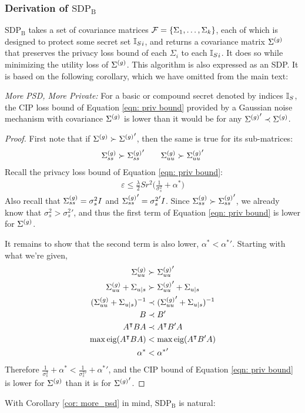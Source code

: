 \subsubsection{Derivation of $\text{SDP}_\text{B}$ }
\label{apx: SDP B}
$\text{SDP}_\text{B}$ takes a set of covariance matrices $\mathcal{F} = \{\Sigma_1, \dots, \Sigma_k\}$, each of which is designed to protect some secret set ${{\mathbb{I}_S}}_i$, and returns a covariance matrix $\Sigma^{(g)}$ that preserves the privacy loss bound of each $\Sigma_i$ to each ${{\mathbb{I}_S}}_i$. It does so while minimizing the utility loss of $\Sigma^{(g)}$. This algorithm is also expressed as an SDP. It is based on the following corollary, which we have omitted from the main text: 
\begin{corollary}\emph{More PSD, More Private: }
\label{cor: more_psd}
	For a basic or compound secret denoted by indices ${\mathbb{I}_S}$, the CIP loss bound of Equation \ref{eqn: priv bound} provided by a Gaussian noise mechanism with covariance $\Sigma^{(g)}$ is lower than it would be for any ${\Sigma^{(g)}}' \prec \Sigma^{(g)}$. 
\end{corollary}
\begin{proof}
	First note that if $\Sigma^{(g)} \succ {\Sigma^{(g)}}' $, then the same is true for its sub-matrices: 
	\begin{align*}
		\Sigma^{(g)}_{ss} \succ {\Sigma^{(g)}_{ss}}'
		\quad \quad
		\Sigma^{(g)}_{uu} \succ {\Sigma^{(g)}_{uu}}'
	\end{align*}
	Recall the privacy loss bound of Equation \ref{eqn: priv bound}: 
	\begin{align*}
		\varepsilon \leq \frac{\lambda}{2} S r^2 \Big(  \frac{1 }{\sigma_s^2} + \alpha^*  \Big)
	\end{align*}
	Also recall that $\Sigma^{(g)}_{ss} = \sigma_s^2 I$ and ${\Sigma^{(g)}_{ss}}' = {\sigma_s^2}' I$. Since $\Sigma^{(g)}_{ss} \succ {\Sigma^{(g)}_{ss}}'$, we already know that $\sigma_s^2 > {\sigma_s^2}'$, and thus the first term of Equation \ref{eqn: priv bound} is lower for $\Sigma^{(g)}$.
	
	It remains to show that the second term is also lower, $\alpha^* < {\alpha^*}'$. Starting with what we're given, 
	\begin{align*}
		\Sigma^{(g)}_{uu} &\succ {\Sigma^{(g)}_{uu}}' \\
		\Sigma^{(g)}_{uu} + \Sigma_{u|s} &\succ {\Sigma^{(g)}_{uu}}' + \Sigma_{u|s} \\
		(\Sigma^{(g)}_{uu} + \Sigma_{u|s})^{-1} &\prec ({\Sigma^{(g)}_{uu}}' + \Sigma_{u|s})^{-1} \\
		B &\prec B' \\
		A^\intercal B A &\prec A^\intercal B' A \\
		{\max \text{eig}}(A^\intercal B A) &< {\max \text{eig}}(A^\intercal B' A) \\
		\alpha^* &< {\alpha^*}'
	\end{align*}
	Therefore $\frac{1}{\sigma_s^2} + \alpha^* < \frac{1}{{\sigma_s^2}'} + {\alpha^*}'$, and the CIP bound of Equation \ref{eqn: priv bound} is lower for $\Sigma^{(g)}$ than it is for ${\Sigma^{(g)}}'$. 
\end{proof}
With Corollary \ref{cor: more_psd} in mind, $\text{SDP}_\text{B}$ is natural: 

